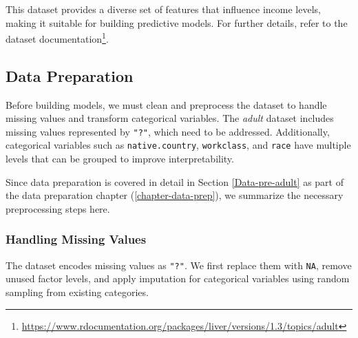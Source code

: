 \documentclass[
  11pt,
]{book}
\makeatletter
\newenvironment{Shaded}{}{}
\newcommand{\CommentTok}[1]{\textcolor[rgb]{0.36,0.36,0.36}{#1}}
\newcommand{\ConstantTok}[1]{#1}
\newcommand{\FunctionTok}[1]{#1}
\newcommand{\NormalTok}[1]{#1}
\newcommand{\OtherTok}[1]{\textcolor[rgb]{0.39,0.39,0.39}{#1}}
\newcommand{\SpecialCharTok}[1]{\textcolor[rgb]{0.39,0.39,0.39}{#1}}
\newcommand{\StringTok}[1]{\textcolor[rgb]{0.39,0.39,0.39}{#1}}
\renewcommand{\href}[2]{#2\footnote{\url{#1}}}
\newenvironment{kframe}{%
\medskip{}
\setlength{\fboxsep}{.8em}
 \def\at@end@of@kframe{}%
 \ifinner\ifhmode%
  \def\at@end@of@kframe{\end{minipage}}%
  \begin{minipage}{\columnwidth}%
 \fi\fi%
 \def\FrameCommand##1{\hskip\@totalleftmargin \hskip-\fboxsep
 \colorbox{shadecolor}{##1}\hskip-\fboxsep
     \hskip-\linewidth \hskip-\@totalleftmargin \hskip\columnwidth}%
 \MakeFramed {\advance\hsize-\width
   \@totalleftmargin\z@ \linewidth\hsize
   \@setminipage}}%
 {\par\unskip\endMakeFramed%
 \at@end@of@kframe}
\renewenvironment{Shaded}{\begin{kframe}}{\end{kframe}}
\theoremstyle{definition}
\theoremstyle{definition}
\theoremstyle{definition}
\theoremstyle{definition}
\theoremstyle{remark}
\makeatother
\begin{document}
This dataset provides a diverse set of features that influence income levels, making it suitable for building predictive models. For further details, refer to the \href{https://www.rdocumentation.org/packages/liver/versions/1.3/topics/adult}{dataset documentation}.

\subsection*{Data Preparation}\label{data-preparation-3}


Before building models, we must clean and preprocess the dataset to handle missing values and transform categorical variables. The \emph{adult} dataset includes missing values represented by \texttt{"?"}, which need to be addressed. Additionally, categorical variables such as \texttt{native.country}, \texttt{workclass}, and \texttt{race} have multiple levels that can be grouped to improve interpretability.

Since data preparation is covered in detail in Section \ref{Data-pre-adult} as part of the data preparation chapter (\ref{chapter-data-prep}), we summarize the necessary preprocessing steps here.

\subsubsection*{Handling Missing Values}\label{handling-missing-values}


The dataset encodes missing values as \texttt{"?"}. We first replace them with \texttt{NA}, remove unused factor levels, and apply imputation for categorical variables using random sampling from existing categories.

\begin{Shaded}
\end{Shaded}
\end{document}
